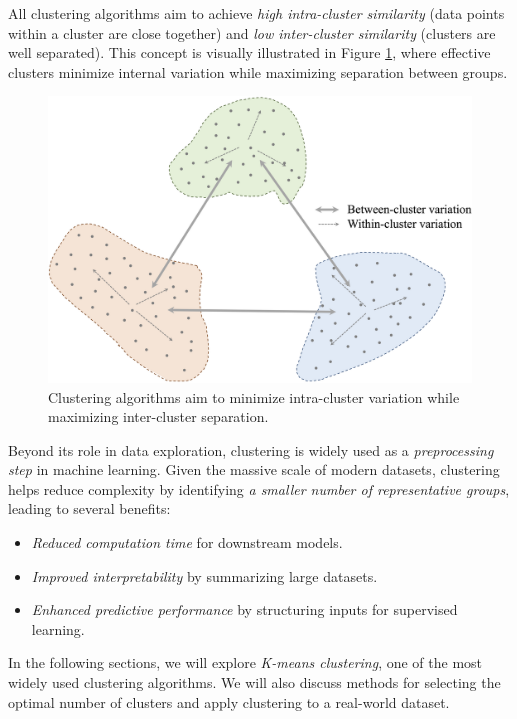 \documentclass[
]{book}
\providecommand{\tightlist}{%
  \setlength{\itemsep}{0pt}\setlength{\parskip}{0pt}}
\theoremstyle{definition}
\theoremstyle{definition}
\theoremstyle{definition}
\theoremstyle{definition}
\theoremstyle{remark}
\begin{document}
All clustering algorithms aim to achieve \emph{high intra-cluster similarity} (data points within a cluster are close together) and \emph{low inter-cluster similarity} (clusters are well separated). This concept is visually illustrated in Figure \ref{fig:cluster-1}, where effective clusters minimize internal variation while maximizing separation between groups.

\begin{figure}

{\centering \includegraphics[width=0.75\linewidth]{images/ch13_cluster_1} 

}

\caption{Clustering algorithms aim to minimize intra-cluster variation while maximizing inter-cluster separation.}\label{fig:cluster-1}
\end{figure}

Beyond its role in data exploration, clustering is widely used as a \emph{preprocessing step} in machine learning. Given the massive scale of modern datasets, clustering helps reduce complexity by identifying \emph{a smaller number of representative groups}, leading to several benefits:

\begin{itemize}
\tightlist
\item
  \emph{Reduced computation time} for downstream models.\\
\item
  \emph{Improved interpretability} by summarizing large datasets.\\
\item
  \emph{Enhanced predictive performance} by structuring inputs for supervised learning.
\end{itemize}

In the following sections, we will explore \emph{K-means clustering}, one of the most widely used clustering algorithms. We will also discuss methods for selecting the optimal number of clusters and apply clustering to a real-world dataset.
\end{document}
